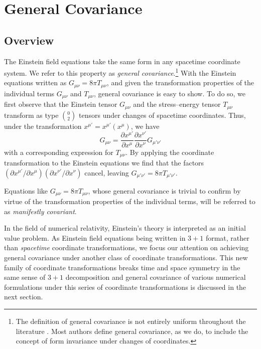 \chapter{General Covariance}\label{generalcovariance}
\section{Overview}
The Einstein field equations take the same 
form in any spacetime coordinate system. We refer to this property as {\em general covariance}.\footnote{The definition of 
general covariance is not entirely uniform throughout the literature \cite{Weinberg:GRbook,Misner:1974qy,Wald:GRbook,Lambourne:GRbook}. Most authors 
define general covariance, as we do, to include the concept of form invariance under changes of coordinates.} 
With the Einstein equations written as $G_{\mu\nu} = 8\pi T_{\mu\nu}$, and given the transformation properties 
of the individual terms $G_{\mu\nu}$ and $T_{\mu\nu}$, general covariance is easy to show. To do so, we first observe that 
the Einstein tensor $G_{\mu\nu}$ and the stress--energy tensor $T_{\mu\nu}$ transform as type $0\choose 2$ tensors under changes 
of spacetime coordinates. Thus, under the  
transformation $x^{\mu'} = x^{\mu'}(x^\mu)$, we have
\begin{equation}
	G_{\mu\nu} = \frac{\partial x^{\mu'}}{\partial x^{\mu}} \frac{\partial x^{\nu'}}{\partial x^{\nu}} G_{\mu'\nu'} 
\end{equation}
with a corresponding expression for $T_{\mu\nu}$. By applying the coordinate transformation 
to the Einstein equations we find that the factors 
$(\partial x^{\mu'}/\partial x^{\mu}) (\partial x^{\nu'}/\partial x^{\nu})$
cancel, leaving $G_{\mu'\nu'} = 8\pi T_{\mu'\nu'}$. 

Equations like $G_{\mu\nu} = 8\pi T_{\mu\nu}$, whose general covariance is trivial to confirm by virtue 
of the transformation properties of the individual terms, will be referred to as {\em manifestly covariant}. 

In the field of numerical relativity, Einstein's theory is interpreted as an initial value problem. As Einstein field equations being written in $3 + 1$ format, rather than {\em spacetime} coordinate transformations, we focus our attention on achieving general covariance under another class of coordinate transformations. This new family of coordinate transformations breaks time and space symmetry in the same sense of $3 + 1$ decomposition and general covariance of various numerical formulations under this series of coordinate transformations is discussed in the next section. 
